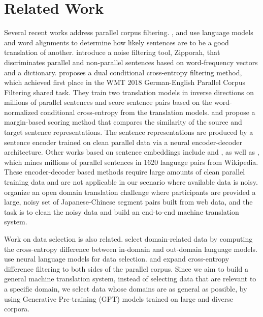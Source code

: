 \documentclass[11pt,a4paper]{article}
\begin{document}
 \section{Related Work}
Several recent works address parallel corpus filtering.
\citet{denkowski2012cmu}, \citet{dyer2010cdec} and \citet{heafield2011kenlm} use language models and word alignments to determine how likely sentences are to be a good translation of another. \citet{xu2017zipporah} introduce a noise filtering tool, Zipporah, that discriminates parallel and non-parallel sentences based on word-frequency vectors and a dictionary. 
\citet{junczys2018dual} proposes a dual conditional cross-entropy filtering method, which achieved first place in the WMT 2018 German-English Parallel Corpus Filtering shared task. They train two translation models in inverse directions on millions of parallel sentences and score sentence pairs based on the word-normalized conditional cross-entropy from the translation models.
\citet{artetxe2018margin} and \citet{schwenk2018filtering} propose a margin-based scoring method that compares the similarity of the source and target sentence representations. The sentence representations are produced by a sentence encoder trained on clean parallel data via a neural encoder-decoder architecture. Other works based on sentence embeddings include \citet{hangya2018unsupervised} and \citet{littell2018measuring}, as well as \citet{schwenk2019wikimatrix}, which mines millions of parallel sentences in 1620 language pairs from Wikipedia. These encoder-decoder based methods require large amounts of clean parallel training data and are not applicable in our scenario where available data is noisy.
\citet{2020jazhsharedtask} organize an open domain translation challenge where participants are provided a large, noisy set of Japanese-Chinese segment pairs built from web data, and the task is to clean the noisy data and build an end-to-end machine translation system.








Work on data selection is also related. \citet{moore-lewis-2010-intelligent,junczys2018dual} select domain-related data by computing the cross-entropy difference between in-domain and out-domain language models. \citet{duh2013adaptation} use neural language models for data selection. 
\citet{axelrod2011domain} and \citet{axelrod2015class} expand cross-entropy difference filtering to both sides of the parallel corpus. Since we aim to build a general machine translation system, instead of selecting data that are relevant to a specific domain, we select data whose domains are as general as possible, by using Generative Pre-training (GPT) models trained on large and diverse corpora.
%
 
\end{document}
